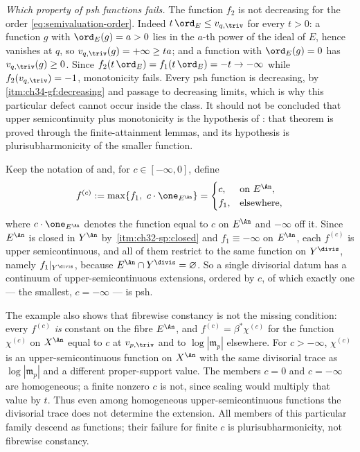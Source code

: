 \begin{example}
\emph{Which property of psh functions fails.}  The function $f_2$ is not
decreasing for the order \eqref{eq:semivaluation-order}.  Indeed
$t\,\ord_E\le v_{q,\triv}$ for every $t>0$: a function $g$ with
$\ord_E(g)=a>0$ lies in the $a$-th power of the ideal of $E$, hence
vanishes at $q$, so $v_{q,\triv}(g)=+\infty\ge ta$; and a function with
$\ord_E(g)=0$ has $v_{q,\triv}(g)\ge0$.  Since
$f_2(t\,\ord_E)=f_1(t\,\ord_E)=-t\to-\infty$ while
$f_2(v_{q,\triv})=-1$, monotonicity fails.  Every psh function is
decreasing, by
\,\cref{itm:ch34-gf:decreasing} and
passage to decreasing limits, which is why this particular defect cannot
occur inside the class.  It should not be concluded that upper
semicontinuity plus monotonicity is the hypothesis of
: that theorem is proved through the
finite-attainment lemmas, and its hypothesis is plurisubharmonicity of the
smaller function.
\end{example}

\begin{example}
\label{ex:ch39-two-usc-extensions}
Keep the notation of  and, for
$c\in[-\infty,0]$, define
\[
 f^{(c)}:=\max\{f_1,\ c\cdot\one_{E^{\An}}\}
 =\begin{cases}
   c,&\text{on }E^{\An},\\
   f_1,&\text{elsewhere},
 \end{cases}
\]
where $c\cdot\one_{E^{\An}}$ denotes the function equal to $c$ on
$E^{\An}$ and $-\infty$ off it.  Since $E^{\An}$ is closed in
$Y^{\An}$ by
\,\cref{itm:ch32-sp:closed} and
$f_1\equiv-\infty$ on $E^{\An}$, each $f^{(c)}$ is upper
semicontinuous, and all of them restrict to the same function on
$Y^{\divis}$, namely $f_1|_{Y^{\divis}}$, because
$E^{\An}\cap Y^{\divis}=\varnothing$.  So a single divisorial datum has a
continuum of upper-semicontinuous extensions, ordered by $c$, of which
exactly one --- the smallest, $c=-\infty$ --- is psh.

The example also shows that fibrewise constancy is not the missing
condition: every $f^{(c)}$ \emph{is} constant on the fibre $E^{\An}$,
and $f^{(c)}=\beta^*\chi^{(c)}$ for the function $\chi^{(c)}$ on
$X^{\An}$ equal to $c$ at $v_{p,\triv}$ and to
$\log|\mathfrak m_p|$ elsewhere.  For $c>-\infty$, $\chi^{(c)}$ is an upper-semicontinuous function on
$X^{\An}$ with the same divisorial trace as $\log|\mathfrak m_p|$
and a different proper-support value.  The members $c=0$ and
$c=-\infty$ are homogeneous; a finite nonzero $c$ is not, since scaling
would multiply that value by $t$.  Thus even among homogeneous
upper-semicontinuous functions the divisorial trace does not determine the
extension.  All members of this particular family descend as functions;
their failure for finite $c$ is plurisubharmonicity, not fibrewise constancy.
\end{example}

